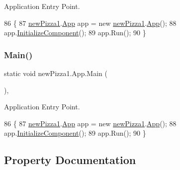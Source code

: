 Application Entry Point. 


\begin{DoxyCode}
86                                   \{
87             \hyperlink{namespacenewPizza1}{newPizza1}.\hyperlink{classnewPizza1_1_1App}{App} app = \textcolor{keyword}{new} \hyperlink{namespacenewPizza1}{newPizza1}.\hyperlink{classnewPizza1_1_1App}{App}();
88             app.\hyperlink{classnewPizza1_1_1App_a437c6582c386ee3f9ee1419133aae6be}{InitializeComponent}();
89             app.Run();
90         \}
\end{DoxyCode}
\mbox{\label{classnewPizza1_1_1App_ab05f0e942749365a0b09024da23f09c4}} 
\subsubsection{\texorpdfstring{Main()}{Main()}\hspace{0.1cm}{\footnotesize\ttfamily [2/2]}}
{\footnotesize\ttfamily static void new\+Pizza1.\+App.\+Main (\begin{DoxyParamCaption}{ }\end{DoxyParamCaption})\hspace{0.3cm}{\ttfamily [inline]}, {\ttfamily [static]}}



Application Entry Point. 


\begin{DoxyCode}
86                                   \{
87             \hyperlink{namespacenewPizza1}{newPizza1}.\hyperlink{classnewPizza1_1_1App}{App} app = \textcolor{keyword}{new} \hyperlink{namespacenewPizza1}{newPizza1}.\hyperlink{classnewPizza1_1_1App}{App}();
88             app.\hyperlink{classnewPizza1_1_1App_a437c6582c386ee3f9ee1419133aae6be}{InitializeComponent}();
89             app.Run();
90         \}
\end{DoxyCode}


\subsection{Property Documentation}
\mbox{\label{classnewPizza1_1_1App_a40f3adef1e0176c5730f8d9ba525c010}} 
